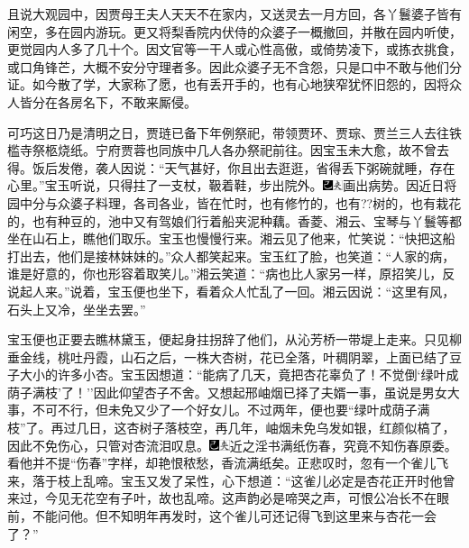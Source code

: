 且说大观园中，因贾母王夫人天天不在家内，又送灵去一月方回，各丫鬟婆子皆有闲空，多在园内游玩。更又将梨香院内伏侍的众婆子一概撤回，并散在园内听使，更觉园内人多了几十个。因文官等一干人或心性高傲，或倚势凌下，或拣衣挑食，或口角锋芒，大概不安分守理者多。因此众婆子无不含怨，只是口中不敢与他们分证。如今散了学，大家称了愿，也有丢开手的，也有心地狭窄犹怀旧怨的，因将众人皆分在各房名下，不敢来厮侵。

可巧这日乃是清明之日，贾琏已备下年例祭祀，带领贾环、贾琮、贾兰三人去往铁槛寺祭柩烧纸。宁府贾蓉也同族中几人各办祭祀前往。因宝玉未大愈，故不曾去得。饭后发倦，袭人因说：``天气甚好，你且出去逛逛，省得丢下粥碗就睡，存在心里。''宝玉听说，只得拄了一支杖，靸着鞋，步出院外。{\includegraphics[width=3mm]{../Images/00003}\includegraphics[width=3mm]{../Images/00012}\footnotesize \kaishu 画出病势。}因近日将园中分与众婆子料理，各司各业，皆在忙时，也有修竹的，也有??树的，也有栽花的，也有种豆的，池中又有驾娘们行着船夹泥种藕。香菱、湘云、宝琴与丫鬟等都坐在山石上，瞧他们取乐。宝玉也慢慢行来。湘云见了他来，忙笑说：``快把这船打出去，他们是接林妹妹的。''众人都笑起来。宝玉红了脸，也笑道：``人家的病，谁是好意的，你也形容着取笑儿。''湘云笑道：``病也比人家另一样，原招笑儿，反说起人来。''说着，宝玉便也坐下，看着众人忙乱了一回。湘云因说：``这里有风，石头上又冷，坐坐去罢。''

宝玉便也正要去瞧林黛玉，便起身拄拐辞了他们，从沁芳桥一带堤上走来。只见柳垂金线，桃吐丹霞，山石之后，一株大杏树，花已全落，叶稠阴翠，上面已结了豆子大小的许多小杏。宝玉因想道：``能病了几天，竟把杏花辜负了！不觉倒`绿叶成荫子满枝'了！''因此仰望杏子不舍。又想起邢岫烟已择了夫婿一事，虽说是男女大事，不可不行，但未免又少了一个好女儿。不过两年，便也要``绿叶成荫子满枝''了。再过几日，这杏树子落枝空，再几年，岫烟未免乌发如银，红颜似槁了，因此不免伤心，只管对杏流泪叹息。{{\includegraphics[width=3mm]{../Images/00003}\includegraphics[width=3mm]{../Images/00012}\footnotesize \kaishu 近之淫书满纸伤春，究竟不知伤春原委。看他并不提``伤春''字样，却艳恨}秾{愁，香流满纸矣。}}正悲叹时，忽有一个雀儿飞来，落于枝上乱啼。宝玉又发了呆性，心下想道：``这雀儿必定是杏花正开时他曾来过，今见无花空有子叶，故也乱啼。这声韵必是啼哭之声，可恨公冶长不在眼前，不能问他。但不知明年再发时，这个雀儿可还记得飞到这里来与杏花一会了？''

